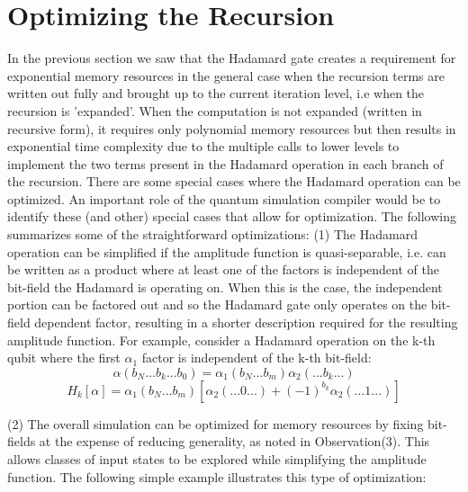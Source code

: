 \documentclass[reqno]{amsart}
\theoremstyle{definition}
\theoremstyle{remark}
\begin{document}
\newpage
\section{Optimizing the Recursion}
\noindent
In the previous section we saw that the Hadamard gate creates a requirement for exponential memory resources in the general case when the recursion terms are written out fully and brought up to the current iteration level, i.e when the recursion is 'expanded'.  When the computation is not expanded (written in recursive form), it requires only polynomial memory resources but then results in exponential time complexity due to the multiple calls to lower levels to implement the two terms present in the Hadamard operation in each branch of the recursion. There are some special cases where the Hadamard operation can be optimized. An important role of the quantum simulation compiler would be to identify these (and other) special cases that allow for optimization. The following summarizes some of the straightforward optimizations:
\newline
\newline
(1) The Hadamard operation can be simplified if the amplitude function is quasi-separable, i.e. can be written as a product where at least one of the factors is independent of the bit-field the Hadamard is operating on. When this is the case, the independent portion can be factored out and so the Hadamard gate only operates on the bit-field dependent factor, resulting in a shorter description required for the resulting amplitude function. For example, consider a Hadamard operation on the k-th qubit where the first $\alpha_1$ factor is independent of the k-th bit-field:
\newline
\newline
\begin{equation}
\alpha(b_N ... b_k ...b_0)  = \alpha_1(b_N ... b_m)\alpha_2(... b_k ...)
\end{equation}
\begin{equation}
H_k[{\alpha}] =  \alpha_1(b_N ... b_m) [\alpha_2(...0...) + (-1)^{b_k} \alpha_2(... 1 ... )]
\end{equation} \newline


(2) The overall simulation can be optimized for memory resources by fixing bit-fields at the expense of reducing generality, as noted in Observation(3). This allows classes of input states to be explored while simplifying the amplitude function. The following simple example illustrates this type of optimization:
\newline
\newline
\end{document}
